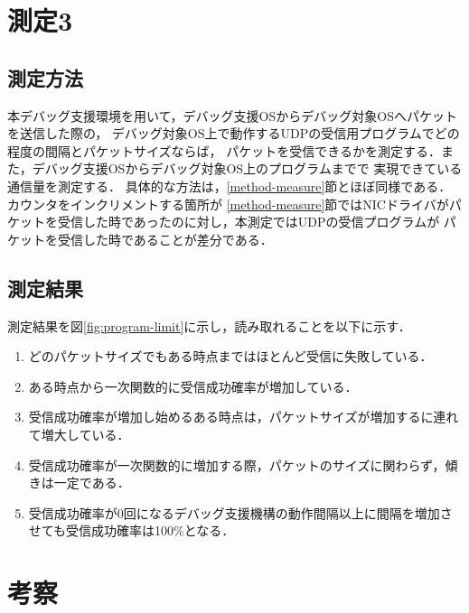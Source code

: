 \documentclass[12pt]{jsarticle}
\begin{document}
\section{測定3}

\subsection{測定方法}

本デバッグ支援環境を用いて，デバッグ支援OSからデバッグ対象OSへパケットを送信した際の，
デバッグ対象OS上で動作するUDPの受信用プログラムでどの程度の間隔とパケットサイズならば，
パケットを受信できるかを測定する．また，デバッグ支援OSからデバッグ対象OS上のプログラムまでで
実現できている通信量を測定する．
具体的な方法は，\ref{method-measure}節とほぼ同様である．カウンタをインクリメントする箇所が
\ref{method-measure}節ではNICドライバがパケットを受信した時であったのに対し，本測定ではUDPの受信プログラムが
パケットを受信した時であることが差分である．

\subsection{測定結果}\label{result-program-limit}


測定結果を図\ref{fig:program-limit}に示し，読み取れることを以下に示す．
\begin{enumerate}
    \item どのパケットサイズでもある時点まではほとんど受信に失敗している．
    \item ある時点から一次関数的に受信成功確率が増加している．
    \item 受信成功確率が増加し始めるある時点は，パケットサイズが増加するに連れて増大している．
    \item 受信成功確率が一次関数的に増加する際，パケットのサイズに関わらず，傾きは一定である．
    \item 受信成功確率が0回になるデバッグ支援機構の動作間隔以上に間隔を増加させても受信成功確率は100\%となる．
\end{enumerate}

\section{考察}
\end{document}
